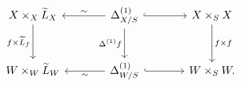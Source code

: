 \[
\begin{tikzcd}[column sep=large,row sep=large]
  X\times_X\widetilde L_X
    \arrow[d,"f\times\widetilde L_f"']
  &
  \Delta^{(1)}_{X/S}
    \arrow[l,"\sim"']
    \arrow[r,hook]
    \arrow[d,"\Delta^{(1)}f"']
  &
  X\times_S X
    \arrow[d,"f\times f"]
  \\
  W\times_W\widetilde L_W
  &
  \Delta^{(1)}_{W/S}
    \arrow[l,"\sim"]
    \arrow[r,hook]
  &
  W\times_S W.
\end{tikzcd}
\]
